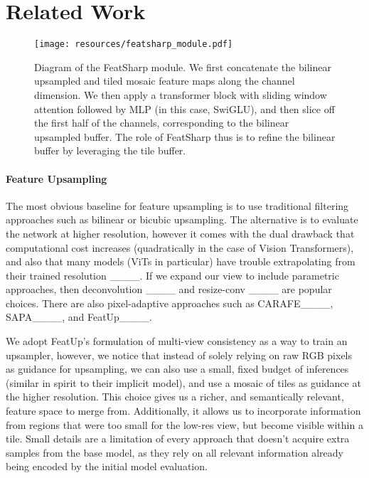 \section{Related Work}
\label{sec:related}

\begin{figure}[t]
    \centering
    \texttt{[image: resources/featsharp\_module.pdf]}
    \caption{Diagram of the FeatSharp module. We first concatenate the bilinear upsampled and tiled mosaic feature maps along the channel dimension. We then apply a transformer block with sliding window attention followed by MLP (in this case, SwiGLU), and then slice off the first half of the channels, corresponding to the bilinear upsampled buffer. The role of FeatSharp thus is to refine the bilinear buffer by leveraging the tile buffer.}
    \label{fig:featsharp_module_diagram}
\end{figure}

\paragraph{Feature Upsampling}
The most obvious baseline for feature upsampling is to use traditional filtering approaches such as bilinear or bicubic upsampling. The alternative is to evaluate the network at higher resolution, however it comes with the dual drawback that computational cost increases (quadratically in the case of Vision Transformers), and also that many models (ViTs in particular) have trouble extrapolating from their trained resolution ____. If we expand our view to include parametric approaches, then deconvolution ____ and resize-conv ____ are popular choices. There are also pixel-adaptive approaches such as CARAFE____, SAPA____, and FeatUp____. 

We adopt FeatUp's formulation of multi-view consistency as a way to train an upsampler, however, we notice that instead of solely relying on raw RGB pixels as guidance for upsampling, we can also use a small, fixed budget of inferences (similar in spirit to their implicit model), and use a mosaic of tiles as guidance at the higher resolution. This choice gives us a richer, and semantically relevant, feature space to merge from. Additionally, it allows us to incorporate information from regions that were too small for the low-res view, but become visible within a tile. Small details are a limitation of every approach that doesn't acquire extra samples from the base model, as they rely on all relevant information already being encoded by the initial model evaluation.

